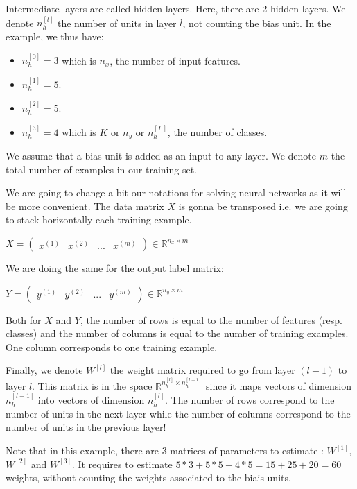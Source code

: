 \documentclass[a4paper, 12pt]{article}
\begin{document}
Intermediate layers are called hidden layers. Here, there are 2 hidden layers. We denote $n_{h}^{[l]}$ the number of units in layer $l$, not counting the bias unit. In the example, we thus have:

\begin{itemize}
\item $n_{h}^{[0]} = 3$ which is $n_x$, the number of input features.
\item $n_{h}^{[1]} = 5$.
\item $n_{h}^{[2]} = 5$.
\item $n_{h}^{[3]} = 4$ which is $K$ or $n_y$ or $n_{h}^{[L]}$, the number of classes.
\end{itemize}

We assume that a bias unit is added as an input to any layer. We denote $m$ the total number of examples in our training set.

We are going to change a bit our notations for solving neural networks as it will be more convenient. The data matrix $X$ is gonna be transposed i.e. we are going to stack horizontally each training example.

$X = \begin{pmatrix} x^{(1)} & x^{(2)} & ... & x^{(m)} \end{pmatrix} \in \mathbb{R}^{n_{x}\times m}$

We are doing the same for the output label matrix:

$Y = \begin{pmatrix} y^{(1)} & y^{(2)} & ... & y^{(m)} \end{pmatrix} \in \mathbb{R}^{n_{y}\times m}$

Both for $X$ and $Y$, the number of rows is equal to the number of features (resp. classes) and the number of columns is equal to the number of training examples. One column corresponds to one training example. 

Finally, we denote $W^{[l]}$ the weight matrix required to go from layer $(l-1)$ to layer $l$. This matrix is in the space $\mathbb{R}^{n_h^{[l]} \times n_h^{[l-1]}}$ since it maps vectors of dimension $n_h^{[l-1]}$  into vectors of dimension $n_h^{[l]}$. The number of rows correspond to the number of units in the next layer while the number of columns correspond to the number of units in the previous layer!

Note that in this example, there are 3 matrices of parameters to estimate : $W^{[1]}$, $W^{[2]}$ and $W^{[3]}$. It requires to estimate $5*3 + 5*5 + 4*5 = 15 + 25 + 20 = 60$ weights, without counting the weights associated to the biais units. 
\end{document}

